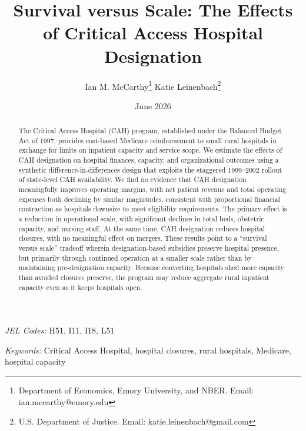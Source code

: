 \documentclass[a4paper, 12pt, twoside]{article}
\begin{document}
\thispagestyle{empty}

\title{
\vspace{-1.5cm}\Huge
Survival versus Scale: The Effects of Critical Access Hospital Designation
}


\author{
\large Ian M. McCarthy\footnote{\scriptsize Department of Economics, Emory University, and NBER. Email: ian.mccarthy@emory.edu} \hspace{0.2cm} \large Katie Leinenbach\footnote{\scriptsize U.S. Department of Justice. Email: katie.leinenbach@gmail.com} }
\date{June 2026}
\maketitle

\onehalfspace

\begin{abstract}
\noindent The Critical Access Hospital (CAH) program, established under the Balanced Budget Act of 1997, provides cost-based Medicare reimbursement to small rural hospitals in exchange for limits on inpatient capacity and service scope. We estimate the effects of CAH designation on hospital finances, capacity, and organizational outcomes using a synthetic difference-in-differences design that exploits the staggered 1999--2002 rollout of state-level CAH availability. We find no evidence that CAH designation meaningfully improves operating margins, with net patient revenue and total operating expenses both declining by similar magnitudes, consistent with proportional financial contraction as hospitals downsize to meet eligibility requirements. The primary effect is a reduction in operational scale, with significant declines in total beds, obstetric capacity, and nursing staff. At the same time, CAH designation reduces hospital closures, with no meaningful effect on mergers. These results point to a ``survival versus scale'' tradeoff wherein designation-based subsidies preserve hospital presence, but primarily through continued operation at a smaller scale rather than by maintaining pre-designation capacity. Because converting hospitals shed more capacity than avoided closures preserve, the program may reduce aggregate rural inpatient capacity even as it keeps hospitals open.
\end{abstract}

\bigskip

\noindent \textit{JEL Codes:} H51, I11, I18, L51

\noindent \textit{Keywords:} Critical Access Hospital, hospital closures, rural hospitals, Medicare, hospital capacity
\end{document}
